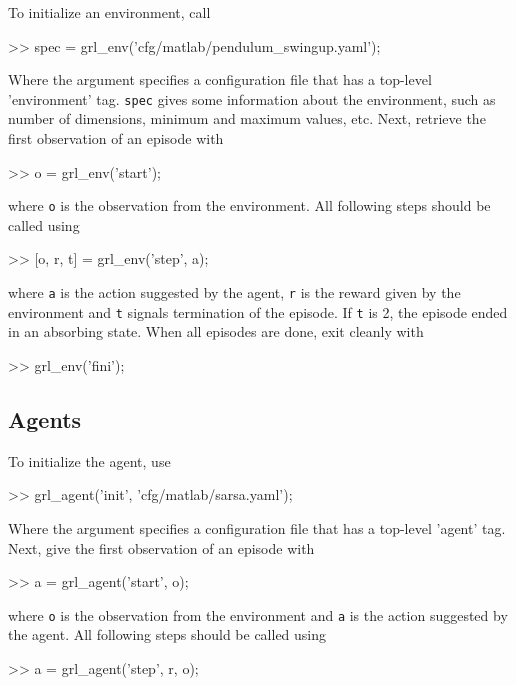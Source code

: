\documentclass{article}
\newcommand{\txt}[1]{\texttt{#1}}
\newenvironment{code}{\alltt}{\endalltt}
\begin{document}
To initialize an environment, call

\begin{code}
>> spec = grl_env('cfg/matlab/pendulum_swingup.yaml');
\end{code}

Where the argument specifies a configuration file that has a top-level
'environment' tag. \txt{spec} gives some information about the environment,
such as number of dimensions, minimum and maximum values, etc. Next,
retrieve the first observation of an episode with

\begin{code}
>> o = grl_env('start');
\end{code}

where \txt{o} is the observation from the environment. All following
steps should be called using

\begin{code}
>> [o, r, t] = grl_env('step', a);
\end{code}

where \txt{a} is the action suggested by the agent, \txt{r} is the reward
given by the environment and \txt{t} signals termination of the episode.
If \txt{t} is 2, the episode ended in an absorbing state. When all episodes
are done, exit cleanly with

\begin{code}
>> grl_env('fini');
\end{code}

\subsection{Agents}

To initialize the agent, use

\begin{code}
>> grl_agent('init', 'cfg/matlab/sarsa.yaml');
\end{code}

Where the argument specifies a configuration file that has a top-level
'agent' tag. Next, give the first observation of an episode with

\begin{code}
>> a = grl_agent('start', o);
\end{code}

where \txt{o} is the observation from the environment and \txt{a} is the
action suggested by the agent. All following steps should be called using

\begin{code}
>> a = grl_agent('step', r, o);
\end{code}
\end{document}
